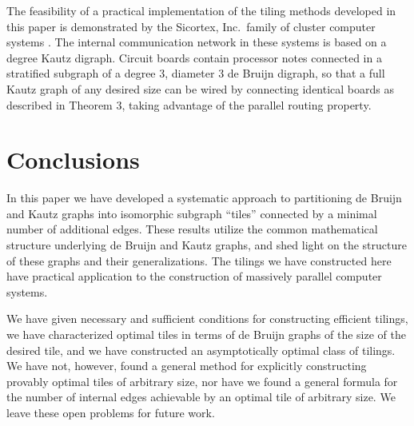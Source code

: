 \documentclass[12pt]{article}
\begin{document}
The feasibility of a practical implementation of the tiling methods
developed in this paper is demonstrated by the Sicortex, Inc.\ family
of cluster computer systems \cite{sc-reference}.  The internal
communication network in these systems is based on a degree 
Kautz digraph.  Circuit boards contain processor notes connected in a
stratified subgraph of a degree 3, diameter 3 de Bruijn digraph, so
that a full Kautz graph of any desired size can be wired by connecting
identical boards as described in Theorem 3, taking  
advantage of the parallel routing property.

\section{Conclusions}

In this paper we have developed a systematic approach to partitioning
de Bruijn and Kautz graphs into isomorphic subgraph  ``tiles''
connected by a minimal number of additional edges.  These results
utilize the common mathematical structure underlying de Bruijn and
Kautz graphs, and shed light on the structure of these graphs and
their generalizations.  The tilings we have constructed here have
practical application to the construction of massively parallel
computer systems.

We have given necessary and sufficient conditions for
constructing efficient tilings, we have characterized optimal
tiles in terms of de Bruijn graphs of the size of the desired tile,
and we have constructed an asymptotically optimal class of tilings.
We
have not, however, found a general method for explicitly constructing provably
optimal tiles of arbitrary size, nor have we found a general formula
for the number of internal edges achievable by an optimal tile of
arbitrary size.  We leave these open problems for future work.

\newpage



\end{document}

